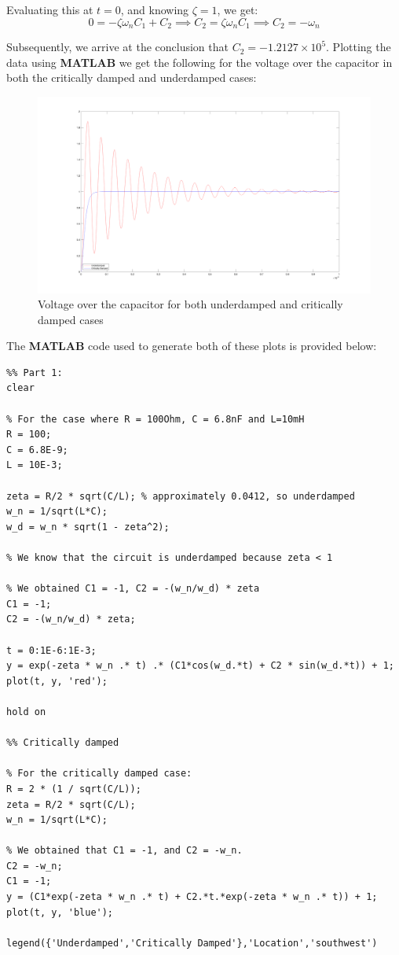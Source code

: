 Evaluating this at $t=0$, and knowing $\zeta = 1$, we get:
\begin{equation}
    0 = -\zeta \omega_n C_1 + C_2 \implies C_2 = \zeta \omega_n C_1 \implies C_2 = -\omega_n
\end{equation}

Subsequently, we arrive at the conclusion that $C_2 = -1.2127\times10^5$.
Plotting the data using {\bf MATLAB} we get the following for the voltage over the capacitor in both the critically damped and underdamped cases:

\begin{figure}[H]
    \centering
    \includegraphics[width=\linewidth]{images/evaluation_vc_full.png}
    \caption{Voltage over the capacitor for both underdamped and critically damped cases}
    \label{fig:evaluation_vc_crit}
\end{figure}

The {\bf MATLAB} code used to generate both of these plots is provided below:
\newpage
\begin{verbatim}
%% Part 1:
clear

% For the case where R = 100Ohm, C = 6.8nF and L=10mH
R = 100;
C = 6.8E-9;
L = 10E-3;

zeta = R/2 * sqrt(C/L); % approximately 0.0412, so underdamped
w_n = 1/sqrt(L*C);
w_d = w_n * sqrt(1 - zeta^2);

% We know that the circuit is underdamped because zeta < 1

% We obtained C1 = -1, C2 = -(w_n/w_d) * zeta
C1 = -1;
C2 = -(w_n/w_d) * zeta;

t = 0:1E-6:1E-3;
y = exp(-zeta * w_n .* t) .* (C1*cos(w_d.*t) + C2 * sin(w_d.*t)) + 1;
plot(t, y, 'red');

hold on

%% Critically damped

% For the critically damped case:
R = 2 * (1 / sqrt(C/L));
zeta = R/2 * sqrt(C/L);
w_n = 1/sqrt(L*C);

% We obtained that C1 = -1, and C2 = -w_n.
C2 = -w_n;
C1 = -1;
y = (C1*exp(-zeta * w_n .* t) + C2.*t.*exp(-zeta * w_n .* t)) + 1;
plot(t, y, 'blue');

legend({'Underdamped','Critically Damped'},'Location','southwest')
\end{verbatim}

